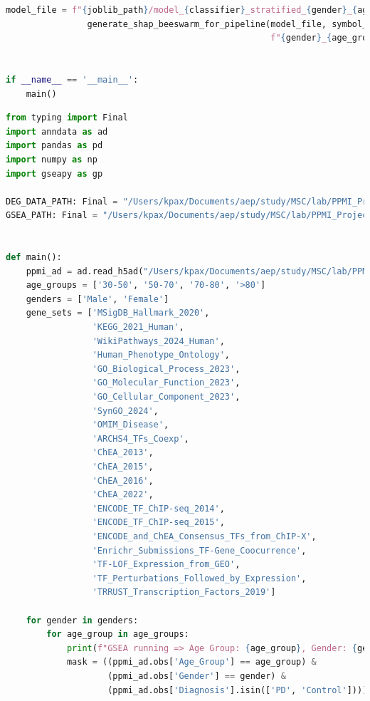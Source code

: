 \documentclass[12pt]{report}
\begin{document}
\begin{lstlisting}[language=Python,caption={shap\_analysis\_stratified.py: Ανάλυση SHAP όλων των αποτελεσμάτων κατηγοριοποίησης από τους αλγορίθμους ML}, label=lst:shapanalysisstratified]
                model_file = f"{joblib_path}/model_{classifier}_stratified_{gender}_{age_group}_{classifier}_useSMOTE_{withSmote}.joblib"
                generate_shap_beeswarm_for_pipeline(model_file, symbol_ensembl_mapping, results_path,
                                                    f"{gender}_{age_group}_useSMOTE_{withSmote}", classifier)


if __name__ == '__main__':
    main()        
    \end{lstlisting}
    
    \begin{lstlisting}[language=Python,caption={gsea\_stratified\_batch\_consolidated\_visits.py: Ανάλυση εμπλουτισμού με χρήση της βιβλιοθήκης gseapy σε Python}, label=lst:gseastratifiedbatchconsolidatedvisits]
from typing import Final
import anndata as ad
import pandas as pd
import numpy as np
import gseapy as gp

DEG_DATA_PATH: Final = "/Users/kpax/Documents/aep/study/MSC/lab/PPMI_Project_133_RNASeq/data/deg_consolidated_visits"
GSEA_PATH: Final = "/Users/kpax/Documents/aep/study/MSC/lab/PPMI_Project_133_RNASeq/data/gsea"


def main():
    ppmi_ad = ad.read_h5ad("/Users/kpax/Documents/aep/study/MSC/lab/PPMI_Project_133_RNASeq/ppmi_adata.h5ad")
    age_groups = ['30-50', '50-70', '70-80', '>80']
    genders = ['Male', 'Female']
    gene_sets = ['MSigDB_Hallmark_2020',
                 'KEGG_2021_Human',
                 'WikiPathways_2024_Human',
                 'Human_Phenotype_Ontology',
                 'GO_Biological_Process_2023',
                 'GO_Molecular_Function_2023',
                 'GO_Cellular_Component_2023',
                 'SynGO_2024',
                 'OMIM_Disease',
                 'ARCHS4_TFs_Coexp',
                 'ChEA_2013',
                 'ChEA_2015',
                 'ChEA_2016',
                 'ChEA_2022',
                 'ENCODE_TF_ChIP-seq_2014',
                 'ENCODE_TF_ChIP-seq_2015',
                 'ENCODE_and_ChEA_Consensus_TFs_from_ChIP-X',
                 'Enrichr_Submissions_TF-Gene_Coocurrence',
                 'TF-LOF_Expression_from_GEO',
                 'TF_Perturbations_Followed_by_Expression',
                 'TRRUST_Transcription_Factors_2019']

    for gender in genders:
        for age_group in age_groups:
            print(f"GSEA running => Age Group: {age_group}, Gender: {gender}")
            mask = ((ppmi_ad.obs['Age_Group'] == age_group) &
                    (ppmi_ad.obs['Gender'] == gender) &
                    (ppmi_ad.obs['Diagnosis'].isin(['PD', 'Control'])))


\end{lstlisting}
\end{document}
